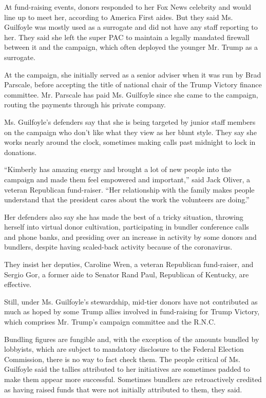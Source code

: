 At fund-raising events, donors responded to her Fox News celebrity and
would line up to meet her, according to America First aides. But they
said Ms. Guilfoyle was mostly used as a surrogate and did not have any
staff reporting to her. They said she left the super PAC to maintain a
legally mandated firewall between it and the campaign, which often
deployed the younger Mr. Trump as a surrogate.

At the campaign, she initially served as a senior adviser when it was
run by Brad Parscale, before accepting the title of national chair of
the Trump Victory finance committee. Mr. Parscale has paid Ms. Guilfoyle
since she came to the campaign, routing the payments through his private
company.

Ms. Guilfoyle's defenders say that she is being targeted by junior staff
members on the campaign who don't like what they view as her blunt
style. They say she works nearly around the clock, sometimes making
calls past midnight to lock in donations.

``Kimberly has amazing energy and brought a lot of new people into the
campaign and made them feel empowered and important,'' said Jack Oliver,
a veteran Republican fund-raiser. ``Her relationship with the family
makes people understand that the president cares about the work the
volunteers are doing.''

Her defenders also say she has made the best of a tricky situation,
throwing herself into virtual donor cultivation, participating in
bundler conference calls and phone banks, and presiding over an increase
in activity by some donors and bundlers, despite having scaled-back
activity because of the coronavirus.

They insist her deputies, Caroline Wren, a veteran Republican
fund-raiser, and Sergio Gor, a former aide to Senator Rand Paul,
Republican of Kentucky, are effective.

Still, under Ms. Guilfoyle's stewardship, mid-tier donors have not
contributed as much as hoped by some Trump allies involved in
fund-raising for Trump Victory, which comprises Mr. Trump's campaign
committee and the R.N.C.

Bundling figures are fungible and, with the exception of the amounts
bundled by lobbyists, which are subject to mandatory disclosure to the
Federal Election Commission, there is no way to fact check them. The
people critical of Ms. Guilfoyle said the tallies attributed to her
initiatives are sometimes padded to make them appear more successful.
Sometimes bundlers are retroactively credited as having raised funds
that were not initially attributed to them, they said.

